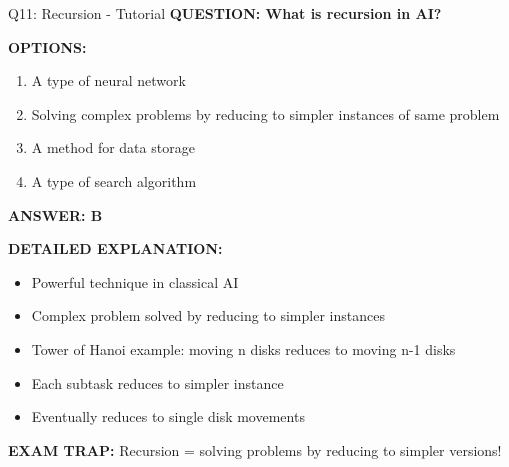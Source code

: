 \documentclass[8pt]{beamer}
\begin{document}
	\begin{frame}{Q11: Recursion - Tutorial}
		\fontsize{6.5}{7.5}\selectfont
		\textbf{QUESTION: What is recursion in AI?}
		
		\vspace{0.1cm}
		\textbf{OPTIONS:}
		\begin{enumerate}
			\item A type of neural network
			\item Solving complex problems by reducing to simpler instances of same problem
			\item A method for data storage
			\item A type of search algorithm
		\end{enumerate}
		
		\vspace{0.1cm}
		\textcolor{myblue}{\textbf{ANSWER: B}}
		
		\vspace{0.1cm}
		\textbf{DETAILED EXPLANATION:}
		\begin{itemize}
			\item Powerful technique in classical AI
			\item Complex problem solved by reducing to simpler instances
			\item Tower of Hanoi example: moving n disks reduces to moving n-1 disks
			\item Each subtask reduces to simpler instance
			\item Eventually reduces to single disk movements
		\end{itemize}
		
		\vspace{0.1cm}
		\textcolor{myred}{\textbf{EXAM TRAP:}} Recursion = \textcolor{myblue}{solving problems by reducing to simpler versions}!
	\end{frame}
	
\end{document}
